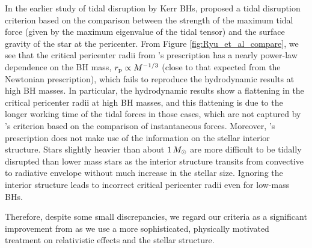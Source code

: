 \documentclass[useAMS,usenatbib]{mn2e}
\def\msun{M_{\rm \odot}}
\def\rp{r_{\rm p}}
\begin{document}
In the earlier study of tidal disruption by Kerr BHs, \cite{Kesden2012} proposed a tidal disruption criterion based on the comparison between the strength of the maximum tidal force (given by the maximum eigenvalue of the tidal tensor) and the surface gravity of the star at the pericenter.
From Figure \ref{fig:Ryu_et_al_compare}, we see that the critical pericenter radii from \cite{Kesden2012}'s prescription has a nearly power-law dependence on the BH mass, $\rp\propto M^{-1/3}$ (close to that expected from the Newtonian prescription), which fails to reproduce the hydrodynamic results at high BH masses. In particular, the hydrodynamic results show a flattening in the critical pericenter radii at high BH masses, and this flattening is due to the longer working time of the tidal forces in those cases, which are not captured by \cite{Kesden2012}'s criterion based on the comparison of instantaneous forces. Moreover, \cite{Kesden2012}'s prescription does not make use of the information on the stellar interior structure. 
Stars slightly heavier than about $1\,\msun$ are more difficult to be tidally disrupted than lower mass stars as the interior structure transits from convective to radiative envelope without much increase in the stellar size.
Ignoring the interior structure leads to incorrect critical pericenter radii even for low-mass BHs.

Therefore, despite some small discrepancies, we regard our criteria as a significant improvement from \cite{Kesden2012} as we use a more sophisticated, physically motivated treatment on relativistic effects and the stellar structure. 
\end{document}
